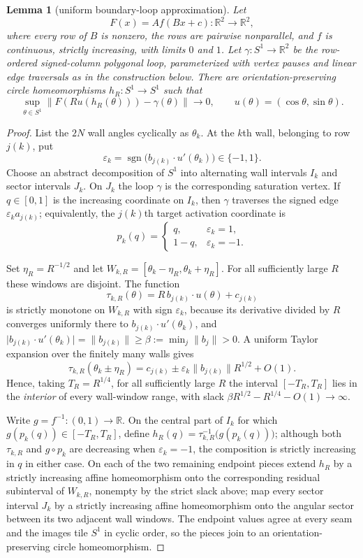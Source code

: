 \documentclass[11pt,twoside,leqno]{article}
\theoremstyle{plain}
\newtheorem{lemma}[lemma]{Lemma}
\theoremstyle{definition}
\theoremstyle{remark}
\newcommand{\R}{\mathbb{R}}
\newcommand{\sgn}{\operatorname{sgn}}
\newcommand{\norm}[1]{\lVert #1 \rVert}
\begin{document}
\begin{lemma}[uniform boundary-loop approximation]\label{lem:uniform-loop}
Let
\[
 F(x)=A f(Bx+c):\R^2\longrightarrow\R^2,
\]
where every row of $B$ is nonzero, the rows are pairwise nonparallel, and $f$ is continuous, strictly increasing, with limits $0$ and $1$.  Let $\gamma:S^1\to\R^2$ be the row-ordered signed-column polygonal loop, parameterized with vertex pauses and linear edge traversals as in the construction below. There are orientation-preserving circle homeomorphisms $h_R:S^1\to S^1$ such that
\[
 \sup_{\theta\in S^1}
 \bigl\|F(Ru(h_R(\theta)))-\gamma(\theta)\bigr\|\longrightarrow0,
 \qquad u(\theta)=(\cos\theta,\sin\theta).
\]
\end{lemma}
\begin{proof}
List the $2N$ wall angles cyclically as $\theta_k$.  At the $k$th wall, belonging to row $j(k)$, put
\[
 \varepsilon_k=\sgn\!\bigl(b_{j(k)}\cdot u'(\theta_k)\bigr)\in\{-1,1\}.
\]
Choose an abstract decomposition of $S^1$ into alternating wall intervals $I_k$ and sector intervals $J_k$.  On $J_k$ the loop $\gamma$ is the corresponding saturation vertex.  If $q\in[0,1]$ is the increasing coordinate on $I_k$, then $\gamma$ traverses the signed edge $\varepsilon_k a_{j(k)}$; equivalently, the $j(k)$th target activation coordinate is
\[
 p_k(q)=\begin{cases}q,&\varepsilon_k=1,\\1-q,&\varepsilon_k=-1.\end{cases}
\]

Set $\eta_R=R^{-1/2}$ and let $W_{k,R}=[\theta_k-\eta_R,\theta_k+\eta_R]$.  For all sufficiently large $R$ these windows are disjoint.  The function
\[
 \tau_{k,R}(\theta)=R\,b_{j(k)}\cdot u(\theta)+c_{j(k)}
\]
is strictly monotone on $W_{k,R}$ with sign $\varepsilon_k$, because its derivative divided by $R$ converges uniformly there to $b_{j(k)}\cdot u'(\theta_k)$, and $\lvert b_{j(k)}\cdot u'(\theta_k)\rvert=\norm{b_{j(k)}}\ge\beta:=\min_j\norm{b_j}>0$. A uniform Taylor expansion over the finitely many walls gives
\[
 \tau_{k,R}(\theta_k\pm\eta_R)=c_{j(k)}\pm\varepsilon_k\norm{b_{j(k)}}R^{1/2}+O(1).
\]
Hence, taking $T_R=R^{1/4}$, for all sufficiently large $R$ the interval $[-T_R,T_R]$ lies in the \emph{interior} of every wall-window range, with slack $\beta R^{1/2}-R^{1/4}-O(1)\to\infty$.

Write $g=f^{-1}:(0,1)\to\R$.  On the central part of $I_k$ for which $g(p_k(q))\in[-T_R,T_R]$, define $h_R(q)=\tau_{k,R}^{-1}\bigl(g(p_k(q))\bigr)$; although both $\tau_{k,R}$ and $g\circ p_k$ are decreasing when $\varepsilon_k=-1$, the composition is strictly increasing in $q$ in either case.  On each of the two remaining endpoint pieces extend $h_R$ by a strictly increasing affine homeomorphism onto the corresponding residual subinterval of $W_{k,R}$, nonempty by the strict slack above; map every sector interval $J_k$ by a strictly increasing affine homeomorphism onto the angular sector between its two adjacent wall windows. The endpoint values agree at every seam and the images tile $S^1$ in cyclic order, so the pieces join to an orientation-preserving circle homeomorphism.


\end{proof}
\end{document}
